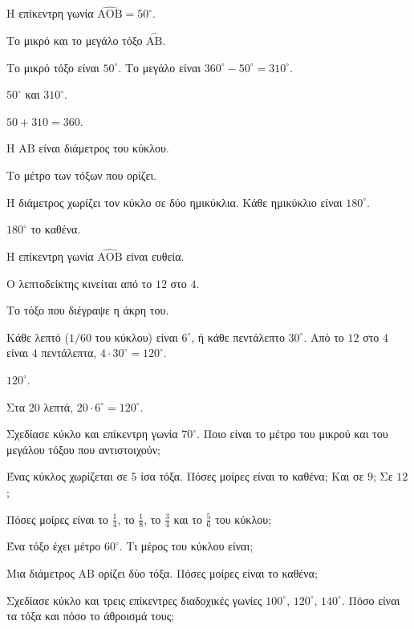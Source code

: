 \tixero Η επίκεντρη γωνία $\widehat{\mathrm{ΑΟΒ}}=50^\circ$.\par
\tithelo Το μικρό και το μεγάλο τόξο $\overset{\frown}{\mathrm{ΑΒ}}$.\par
\possindeo Το μικρό τόξο είναι $50^\circ$. Το μεγάλο είναι $360^\circ-50^\circ=310^\circ$.\par
\apantisi $50^\circ$ και $310^\circ$.\par
\elegxos $50+310=360$.

\tixero Η $\mathrm{ΑΒ}$ είναι διάμετρος του κύκλου.\par
\tithelo Το μέτρο των τόξων που ορίζει.\par
\possindeo Η διάμετρος χωρίζει τον κύκλο σε δύο ημικύκλια. Κάθε ημικύκλιο είναι $180^\circ$.\par
\apantisi $180^\circ$ το καθένα.\par
\elegxos Η επίκεντρη γωνία $\widehat{\mathrm{ΑΟΒ}}$ είναι ευθεία.

\tixero Ο λεπτοδείκτης κινείται από το $12$ στο $4$.\par
\tithelo Το τόξο που διέγραψε η άκρη του.\par
\possindeo Κάθε λεπτό ($1/60$ του κύκλου) είναι $6^\circ$, ή κάθε πεντάλεπτο $30^\circ$. Από το $12$ στο $4$ είναι $4$ πεντάλεπτα, $4\cdot30^\circ=120^\circ$.\par
\apantisi $120^\circ$.\par
\elegxos Στα $20$ λεπτά, $20\cdot6^\circ=120^\circ$.



\ex Σχεδίασε κύκλο και επίκεντρη γωνία $70^\circ$. Ποιο είναι το μέτρο του μικρού και του μεγάλου τόξου που αντιστοιχούν;

\ex Ένας κύκλος χωρίζεται σε $5$ ίσα τόξα. Πόσες μοίρες είναι το καθένα; Και σε $9$; Σε $12$;

\ex Πόσες μοίρες είναι το $\frac{1}{4}$, το $\frac{1}{8}$, το $\frac{3}{4}$ και το $\frac{5}{6}$ του κύκλου;

\ex Ένα τόξο έχει μέτρο $60^\circ$. Τι μέρος του κύκλου είναι;

\ex Μια διάμετρος $\mathrm{ΑΒ}$ ορίζει δύο τόξα. Πόσες μοίρες είναι το καθένα;

\ex Σχεδίασε κύκλο και τρεις επίκεντρες διαδοχικές γωνίες $100^\circ$, $120^\circ$, $140^\circ$. Πόσο είναι τα τόξα και πόσο το άθροισμά τους;

